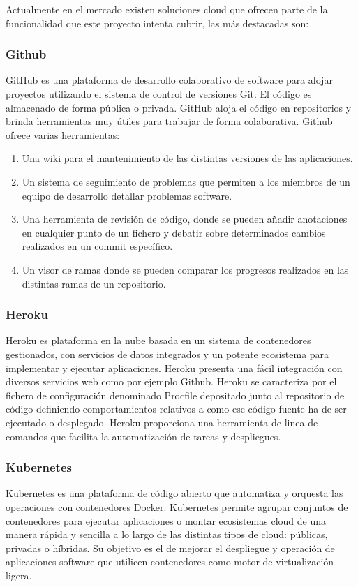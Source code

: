 \documentclass[a4paper,11pt]{book}
\begin{document}
Actualmente en el mercado existen soluciones cloud que ofrecen parte de la funcionalidad que este proyecto intenta cubrir, las más destacadas son: 


\subsubsection{Github}

GitHub\cite{github} es una plataforma de desarrollo colaborativo de software para alojar proyectos utilizando el sistema de control de versiones Git. El código es almacenado de forma pública o privada. GitHub aloja el código en repositorios y brinda herramientas muy útiles para trabajar de forma colaborativa. Github\cite{github2} ofrece varias herramientas:

\begin{enumerate}
\item Una wiki para el mantenimiento de las distintas versiones de las aplicaciones.
\item Un sistema de seguimiento de problemas que permiten a los miembros de un equipo de desarrollo detallar problemas software.
\item Una herramienta de revisión de código, donde se pueden añadir anotaciones en cualquier punto de un fichero y debatir sobre determinados cambios realizados en un commit específico.
\item Un visor de ramas donde se pueden comparar los progresos realizados en las distintas ramas de un repositorio.
\end{enumerate}

\subsubsection{Heroku}

Heroku\cite{hero} es  plataforma en la nube basada en un sistema de contenedores gestionados, con servicios de datos integrados y un potente ecosistema para implementar y ejecutar aplicaciones. Heroku presenta una fácil integración con diversos servicios web como por ejemplo Github. Heroku se caracteriza por el fichero de configuración denominado Procfile depositado junto al repositorio de código definiendo comportamientos relativos a como ese código fuente ha de ser ejecutado o desplegado.  Heroku proporciona una herramienta de linea de comandos que facilita la automatización de tareas y despliegues.

\subsubsection{Kubernetes}
Kubernetes\cite{kube} es una plataforma de código abierto que automatiza y orquesta las operaciones con contenedores Docker. Kubernetes permite agrupar conjuntos de contenedores para ejecutar aplicaciones o montar ecosistemas cloud de una manera rápida y sencilla a lo largo de las distintas tipos de cloud: públicas, privadas o híbridas. Su objetivo es el de mejorar el despliegue y operación de aplicaciones software que utilicen contenedores como motor de virtualización ligera.  
\end{document}
